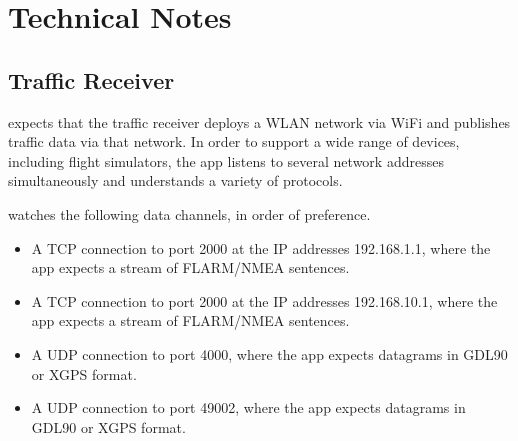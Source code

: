 \documentclass[letterpaper,10pt,english]{sphinxmanual}
\begin{document}
\chapter{Technical Notes}
\label{\detokenize{04-appendix/technical:technical-notes}}\label{\detokenize{04-appendix/technical::doc}}

\section{Traffic Receiver}
\label{\detokenize{04-appendix/technical:traffic-receiver}}
\sphinxAtStartPar
{} expects that the traffic receiver deploys a WLAN
network via Wi\sphinxhyphen{}Fi and publishes traffic data via that network.  In order to
support a wide range of devices, including flight simulators, the app listens to
several network addresses simultaneously and understands a variety of protocols.

\sphinxAtStartPar
{} watches the following data channels, in order of
preference.
\begin{itemize}
\item {} 
\sphinxAtStartPar
A TCP connection to port 2000 at the IP addresses 192.168.1.1, where the app
expects a stream of FLARM/NMEA sentences.

\item {} 
\sphinxAtStartPar
A TCP connection to port 2000 at the IP addresses 192.168.10.1, where the app
expects a stream of FLARM/NMEA sentences.

\item {} 
\sphinxAtStartPar
A UDP connection to port 4000, where the app expects datagrams in GDL90 or
XGPS format.

\item {} 
\sphinxAtStartPar
A UDP connection to port 49002, where the app expects datagrams in GDL90 or
XGPS format.

\end{itemize}
\end{document}
